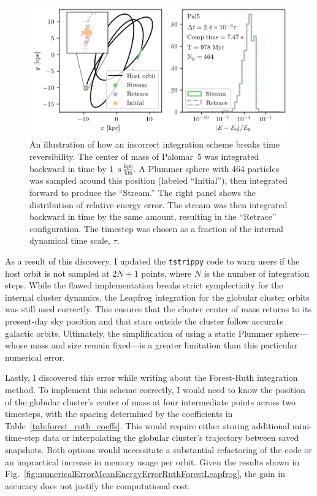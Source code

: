         \begin{figure}
            \centering
            \includegraphics[width=\linewidth]{images/NumericalErrorStreamRetrace_Pal5_Nsteps_32768_stepsPerTau_420.png}
            \caption[An illustration of non-symplectic integration]{An illustration of how an incorrect integration scheme breaks time reversibility. The center of mass of Palomar~5 was integrated backward in time by 1~$\mathrm{s}~\frac{\mathrm{kpc}}{\mathrm{km}}$. A Plummer sphere with 464 particles was sampled around this position (labeled “Initial”), then integrated forward to produce the “Stream.” The right panel shows the distribution of relative energy error. The stream was then integrated backward in time by the same amount, resulting in the “Retrace” configuration. The timestep was chosen as a fraction of the internal dynamical time scale, $\tau$.}
            \label{fig:NumericalErrorStreamRetrace_Pal5_Nsteps_32768_stepsPerTau_420}
        \end{figure}
        As a result of this discovery, I updated the \texttt{tstrippy} code to warn users if the host orbit is not sampled at $2N + 1$ points, where $N$ is the number of integration steps. While the flawed implementation breaks strict symplecticity for the internal cluster dynamics, the Leapfrog integration for the globular cluster orbits was still used correctly. This ensures that the cluster center of mass returns to its present-day sky position and that stars outside the cluster follow accurate galactic orbits. Ultimately, the simplification of using a static Plummer sphere—whose mass and size remain fixed—is a greater limitation than this particular numerical error.

        Lastly, I discovered this error while writing about the Forest-Ruth integration method. To implement this scheme correctly, I would need to know the position of the globular cluster's center of mass at four intermediate points across two timesteps, with the spacing determined by the coefficients in Table~\ref{tab:forest_ruth_coeffs}. This would require either storing additional mini-time-step data or interpolating the globular cluster's trajectory between saved snapshots. Both options would necessitate a substantial refactoring of the code or an impractical increase in memory usage per orbit. Given the results shown in Fig.~\ref{fig:numericalErrorMeanEnergyErrorRuthForestLeapfrog}, the gain in accuracy does not justify the computational cost.


